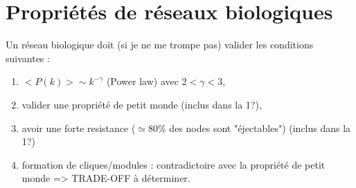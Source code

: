\section{Propriétés de réseaux biologiques}
Un réseau biologique doit (si je ne me trompe pas) valider les conditions suivantes : 
\begin{enumerate}	
	\item $<P(k)> \sim k^{-\gamma}$ (Power law) avec $2<\gamma<3$,
	\item valider une propriété de petit monde (inclus dans la 1?),
	\item avoir une forte resistance ($\simeq$80\% des nodes sont "éjectables") (inclus dans la 1?)
	\item formation de cliques/modules : contradictoire avec la propriété de petit monde => TRADE-OFF à déterminer.
\end{enumerate}

